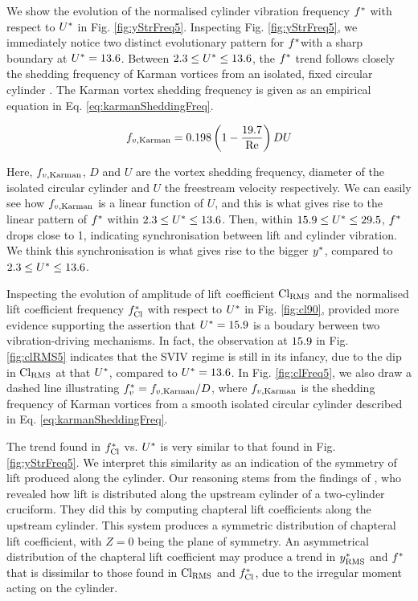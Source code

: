 \documentclass[oneside]{utmthesis}
\begin{document}
We show the evolution of the normalised cylinder vibration frequency $f^{*}$ with respect to $U^{*}$ in Fig. \ref{fig:yStrFreq5}. Inspecting Fig. \ref{fig:yStrFreq5}, we immediately notice two distinct evolutionary pattern for $f^{*}$with a sharp boundary at $U^{*} = 13.6$. Between $2.3 \leq U^{*} \leq 13.6$, the $f^{*}$ trend follows closely the shedding frequency of Karman vortices from an isolated, fixed circular cylinder \citep{Blevins1990}. The Karman vortex shedding frequency is given as an empirical equation in Eq. \ref{eq:karmanSheddingFreq}.

\begin{equation}
  f_{v,\text{Karman}} = 0.198 \left( 1 - \frac{19.7}{\text{Re}} \right) DU
  \label{eq:karmanSheddingFreq}
\end{equation}

\noindent Here, $f_{v,\text{Karman}}$, $D$ and $U$ are the vortex shedding frequency, diameter of the isolated circular cylinder and $U$ the freestream velocity respectively. We can easily see how $f_{v,\text{Karman}}$ is a linear function of $U$, and this is what gives rise to the linear pattern of $f^{*}$ within $2.3 \leq U^{*} \leq 13.6$. Then, within $15.9 \leq U^{*} \leq 29.5$, $f^{*}$ drops close to 1, indicating synchronisation between lift and cylinder vibration. We think this synchronisation is what gives rise to the bigger $y^{*}$, compared to $2.3 \leq U^{*} \leq 13.6$.

Inspecting the evolution of \rms{} amplitude of lift coefficient $\text{Cl}_{\text{RMS}}$ and the normalised lift coefficient frequency $f_{\text{Cl}}^{*}$ with respect to $U^{*}$ in Fig. \ref{fig:cl90}, provided more evidence supporting the assertion that $U^{*} = 15.9$ is a boudary berween two vibration-driving mechanisms. In fact, the observation at $15.9$ in Fig. \ref{fig:clRMS5} indicates that the SVIV regime is still in its infancy, due to the dip in $\text{Cl}_{\text{RMS}}$ at that $U^{*}$, compared to $U^{*} = 13.6$. In Fig. \ref{fig:clFreq5}, we also draw a dashed line illustrating $f^{*}_{v} = f_{v,\text{Karman}}/D$, where $f_{v,\text{Karman}}$ is the shedding frequency of Karman vortices from a smooth isolated circular cylinder described in Eq. \ref{eq:karmanSheddingFreq}.

The trend found in $f_{\text{Cl}}^{*}$ vs. $U^{*}$ is very similar to that found in Fig. \ref{fig:yStrFreq5}. We interpret this similarity as an indication of the symmetry of lift produced along the cylinder. Our reasoning stems from the findings of \citet{Zhao2018a}, who revealed how lift is distributed along the upstream cylinder of a two-cylinder \angfi{} cruciform. They did this by computing chapteral lift coefficients along the upstream cylinder. This system produces a symmetric distribution of chapteral lift coefficient, with $Z = 0$ being the plane of symmetry. An asymmetrical distribution of the chapteral lift coefficient may produce a trend in $y^{*}_{\text{RMS}}$ and $f^{*}$ that is dissimilar to those found in $\text{Cl}_{\text{RMS}}$ and $f_{\text{Cl}}^{*}$, due to the irregular moment acting on the cylinder.
\end{document}

